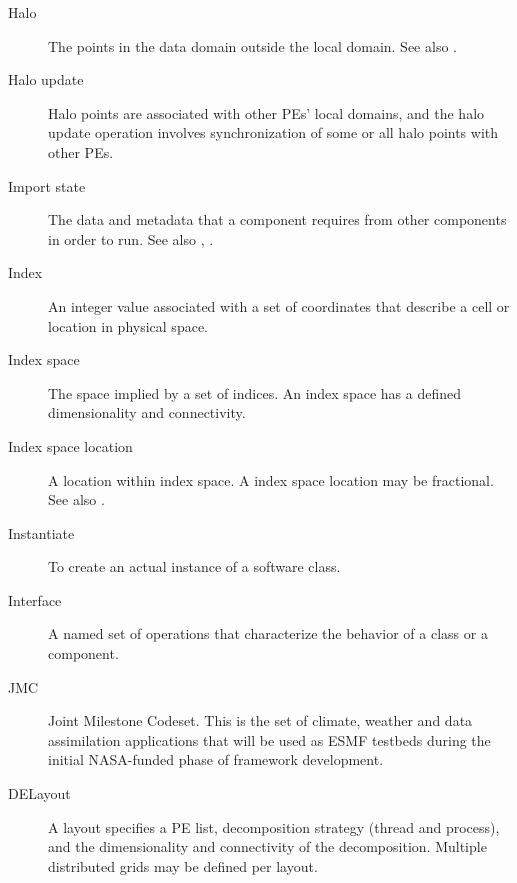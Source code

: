 \begin{description}
\item[Halo] \label{glos:Halo} 
  The points in the data domain outside the local domain. 
  See also . %

\item[Halo update] \label{glos:HaloUpdate}
  Halo points are associated with other PEs'
  local domains, and the halo update operation involves
  synchronization of some or all halo points with other PEs. 

\item[Import state] \label{glos:ImportState} The data and metadata 
  that a component requires from other components in order to run.  
  See also , .

\item[Index] \label{glos:Index} An integer value associated with a set
  of coordinates that describe a cell or location in physical space.

\item[Index space] \label{glos:IndexSpace} The space implied 
  by a set of indices.  An index space has a defined dimensionality and 
  connectivity.

\item[Index space location] \label{glos:IndexSpaceloc} 
  A location within index space.  A index space location may be fractional.
  See also .

\item[Instantiate] \label{glos:Instantiate}
  To create an actual instance of a software class.

\item[Interface] \label{glos:Interface}
  A named set of operations that characterize the behavior of a class
  or a component.

\item[JMC] \label{glos:JMC} 
  Joint Milestone Codeset.  This is the set of climate, weather and
  data assimilation applications that will be used as ESMF testbeds 
  during the initial NASA-funded phase of framework development.

\item[DELayout] \label{glos:DELayout} A layout specifies a PE list, 
  decomposition strategy (thread and process), and the dimensionality 
  and connectivity of the decomposition.  Multiple distributed 
  grids may be defined per layout.


\end{description}
